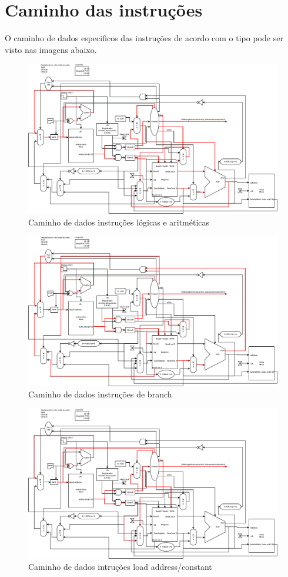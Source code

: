 \documentclass[a4paper, 10pt]{article}
\begin{document}
\section{Caminho das instruções}
O caminho de dados especificos das instruções de acordo com o tipo pode ser visto nas imagens abaixo.
\begin{figure}[H]
	\centering
	\includegraphics[scale=0.12]{dp_3r.png}
	\caption{Caminho de dados instruções lógicas e aritméticas}
	\label{Rotulo}
\end{figure}
\begin{figure}[H]
	\centering
	\includegraphics[scale=0.12]{dp_branch.png}
	\caption{Caminho de dados instruções de branch}
	\label{Rotulo}
\end{figure}
\begin{figure}[H]
	\centering
	\includegraphics[scale=0.12]{dp_k.png}
	\caption{Caminho de dados intruções load address/constant}
	\label{Rotulo}
\end{figure}
\end{document}
